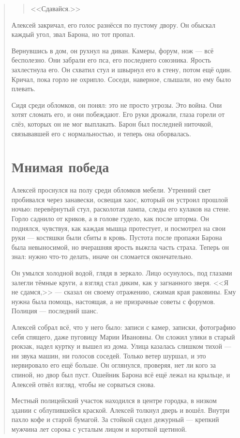 \documentclass[12pt,a4paper]{book}
\newenvironment{dialogue}{\begin{quote}\itshape}{\end{quote}}
\begin{document}
\begin{dialogue}
\begin{quote}
<<Сдавайся.>>
\end{quote}

Алексей закричал, его голос разнёсся по пустому двору. Он обыскал каждый угол, звал Барона, но тот пропал.

Вернувшись в дом, он рухнул на диван. Камеры, форум, нож --- всё бесполезно. Они забрали его пса, его последнего союзника. Ярость захлестнула его. Он схватил стул и швырнул его в стену, потом ещё один. Кричал, пока горло не охрипло. Соседи, наверное, слышали, но ему было плевать.

Сидя среди обломков, он понял: это не просто угрозы. Это война. Они хотят сломать его, и они побеждают. Его руки дрожали, глаза горели от слёз, которых он не мог выплакать. Барон был последней ниточкой, связывавшей его с нормальностью, и теперь она оборвалась.

\chapter{Мнимая победа}

Алексей проснулся на полу среди обломков мебели. Утренний свет пробивался через занавески, освещая хаос, который он устроил прошлой ночью: перевёрнутый стул, расколотая лампа, следы его кулаков на стене. Горло саднило от криков, а в голове гудело, как после шторма. Он поднялся, чувствуя, как каждая мышца протестует, и посмотрел на свои руки --- костяшки были сбиты в кровь. Пустота после пропажи Барона была невыносимой, но вчерашняя ярость выжгла часть страха. Теперь он знал: нужно что-то делать, иначе он сломается окончательно.

Он умылся холодной водой, глядя в зеркало. Лицо осунулось, под глазами залегли тёмные круги, а взгляд стал диким, как у загнанного зверя. <<Я не сдамся,>> --- сказал он своему отражению, сжимая края раковины. Ему нужна была помощь, настоящая, а не призрачные советы с форумов. Полиция --- последний шанс.

Алексей собрал всё, что у него было: записи с камер, записки, фотографию себя спящего, даже пуговицу Марии Ивановны. Он сложил улики в старый рюкзак, надел куртку и вышел из дома. Улица казалась слишком тихой --- ни звука машин, ни голосов соседей. Только ветер шуршал, и это нервировало его ещё больше. Он оглянулся, проверяя, нет ли кого за спиной, но двор был пуст. Ошейник Барона всё ещё лежал на крыльце, и Алексей отвёл взгляд, чтобы не сорваться снова.

Местный полицейский участок находился в центре городка, в низком здании с облупившейся краской. Алексей толкнул дверь и вошёл. Внутри пахло кофе и старой бумагой. За стойкой сидел дежурный --- крепкий мужчина лет сорока с усталым лицом и короткой щетиной.


\end{dialogue}
\end{document}
